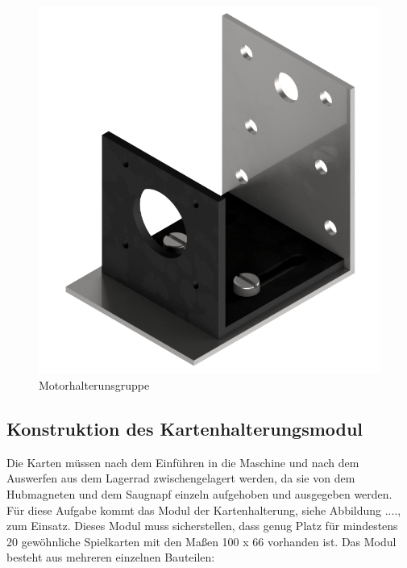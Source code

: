 \begin{figure}
    \centering
    \includegraphics[scale=0.5,page=1]{fig/mech/SchrittmotorCombinedWinkel.png}
    \caption{Motorhalterunsgruppe}
\end{figure}

\subsection{Konstruktion des Kartenhalterungsmodul}
Die Karten müssen nach dem Einführen in die Maschine und nach dem Auswerfen aus dem Lagerrad zwischengelagert werden, da sie
von dem Hubmagneten und dem Saugnapf einzeln aufgehoben und ausgegeben werden. Für diese Aufgabe kommt das Modul der
Kartenhalterung, siehe Abbildung ...., zum Einsatz. Dieses Modul muss sicherstellen, dass genug Platz für mindestens 20 gewöhnliche Spielkarten  mit den Maßen 100 x 66
vorhanden ist. Das Modul besteht aus mehreren einzelnen Bauteilen:

